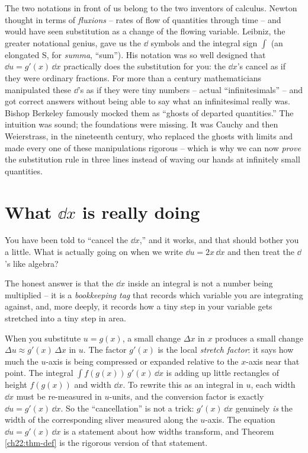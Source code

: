 \begin{historybox}
The two notations in front of us belong to the two inventors of calculus. Newton
thought in terms of \emph{fluxions} -- rates of flow of quantities through time --
and would have seen substitution as a change of the flowing variable. Leibniz, the
greater notational genius, gave us the $\dd$ symbols and the integral sign
$\int$ (an elongated S, for \emph{summa}, ``sum''). His notation was so well
designed that $\dd u = g'(x)\,\dd x$ practically does the substitution for you: the
$\dd x$'s cancel as if they were ordinary fractions. For more than a century
mathematicians manipulated these $\dd$'s as if they were tiny numbers -- actual
``infinitesimals'' -- and got correct answers without being able to say what an
infinitesimal really was. Bishop Berkeley famously mocked them as ``ghosts of
departed quantities.'' The intuition was sound; the foundations were missing. It
was Cauchy and then Weierstrass, in the nineteenth century, who replaced the ghosts
with limits and made every one of these manipulations rigorous -- which is why we
can now \emph{prove} the substitution rule in three lines instead of waving our
hands at infinitely small quantities.
\end{historybox}

\section{What $\dd x$ is really doing}
\label{ch22:what-dx-does}

You have been told to ``cancel the $\dd x$,'' and it works, and that should bother
you a little. What is actually going on when we write $\dd u = 2x\,\dd x$ and then
treat the $\dd$'s like algebra?

\begin{happeningbox}
The honest answer is that the $\dd x$ inside an integral is not a number being
multiplied -- it is a \emph{bookkeeping tag} that records which variable you are
integrating against, and, more deeply, it records how a tiny step in your variable
gets stretched into a tiny step in area.

When you substitute $u = g(x)$, a small change $\Delta x$ in $x$ produces a small
change $\Delta u \approx g'(x)\,\Delta x$ in $u$. The factor $g'(x)$ is the local
\emph{stretch factor}: it says how much the $u$-axis is being compressed or
expanded relative to the $x$-axis near that point. The integral
$\int f(g(x))\,g'(x)\,\dd x$ is adding up little rectangles of height $f(g(x))$ and
width $\dd x$. To rewrite this as an integral in $u$, each width $\dd x$ must be
re-measured in $u$-units, and the conversion factor is exactly $\dd u = g'(x)\,\dd
x$. So the ``cancellation'' is not a trick: $g'(x)\,\dd x$ genuinely \emph{is} the
width of the corresponding sliver measured along the $u$-axis. The equation
$\dd u = g'(x)\,\dd x$ is a statement about how widths transform, and Theorem
\ref{ch22:thm-def} is the rigorous version of that statement.
\end{happeningbox}


